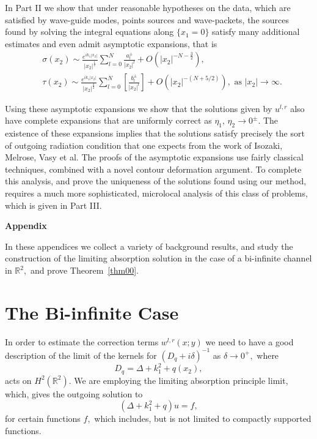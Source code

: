 \documentclass[11pt]{article}
\newcommand\bbR{\mathbb R}
\theoremstyle{definition}
\theoremstyle{remark}
\begin{document}
In Part II we show that under reasonable hypotheses on the data, which are satisfied by
wave-guide modes, points sources and wave-packets, the sources found by solving
the integral equations along $\{x_1=0\}$ satisfy many additional estimates and
even admit asymptotic expansions, that is
\begin{equation}
  \begin{split}
   &\sigma(x_2)\sim\frac{e^{ik_1|x_2|}}{|x_2|^{\frac
       12}}\sum_{l=0}^N\frac{a^{\pm}_l}{|x_2|^l}+O\left(|x_2|^{-N-\frac
      32}\right),\\
    &\tau(x_2)\sim\frac{e^{ik_1|x_2|}}{|x_2|^{\frac 32}}\sum_{l=0}^N\left[\frac{b^{\pm}_l}{|x_2|^{l}}\right]+O\left(|x_2|^{-(N+5/2)}\right), \text{ as }|x_2|\to\infty.
    \end{split}
\end{equation}


Using these asymptotic expansions we show that the solutions given by $u^{l,r}$
also have complete expansions that are uniformly correct as $\eta_1,\, \eta_2\to
0^{\pm}.$ The existence of these expansions implies that the solutions satisfy
precisely the sort of outgoing radiation condition that one expects from the
work of Isozaki, Melrose, Vasy et al.  The proofs of the asymptotic expansions
use fairly classical techniques, combined with a novel contour deformation
argument. To complete this analysis, and prove the uniqueness of the solutions
found using our method, requires a much more sophisticated, microlocal analysis
of this class of problems, which is given in Part III.
\newpage
\appendix

\centerline{\LARGE\bf Appendix}
\bigskip

\noindent
In these appendices we collect a variety of background results, and study the
construction of the limiting absorption solution in the case of a bi-infinite
channel in $\bbR^2,$ and prove Theorem~\ref{thm00}.

 \section{The Bi-infinite Case}\label{sec1}
  In order to estimate the correction terms $w^{l,r}(x;y)$ we need to
  have a good description of the limit of the kernels for
  $(D_q+i\delta)^{-1}$ as $\delta\to 0^+,$ where
  \begin{equation}\label{eqn0}
    D_q=\Delta+k_1^2+q(x_2),
  \end{equation}
  acts on $H^2(\bbR^2).$ We are employing the limiting absorption principle
  limit, which, gives the outgoing solution to
  \begin{equation}\label{eqn0.0}
    (\Delta+k_1^2+q)u=f,
  \end{equation}
  for certain functions $f,$ which includes, but is not limited to compactly
  supported functions.
  
\end{document}
